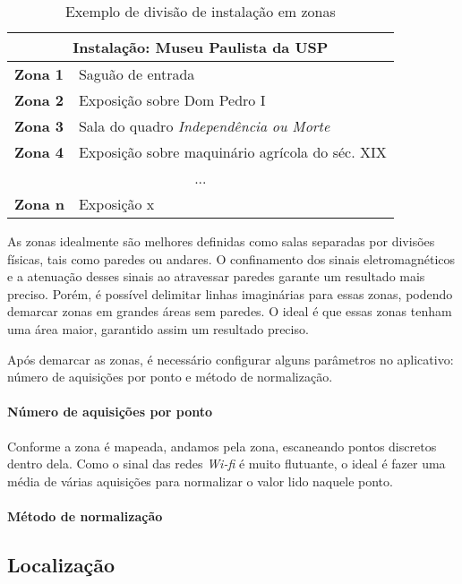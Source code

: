 \begin{table}[htb]
\centering
\caption{Exemplo de divisão de instalação em zonas}
\label{my-label}
\begin{tabular}{|l|l|l|l|l|}
\hline
\multicolumn{5}{|c|}{\textbf{Instalação: Museu Paulista da USP}}             \\ \hline
\multicolumn{2}{|l|}{\textbf{Zona 1}} & \multicolumn{3}{l|}{Saguão de entrada}          \\ \hline
\multicolumn{2}{|l|}{\textbf{Zona 2}} & \multicolumn{3}{l|}{Exposição sobre Dom Pedro I}          \\ \hline
\multicolumn{2}{|l|}{\textbf{Zona 3}} & \multicolumn{3}{l|}{Sala do quadro \textit{Independência ou Morte}}          \\ \hline
\multicolumn{2}{|l|}{\textbf{Zona 4}} & \multicolumn{3}{l|}{Exposição sobre maquinário agrícola do séc. XIX}          \\ \hline
\multicolumn{5}{|c|}{...}                                                    \\ \hline
\multicolumn{2}{|l|}{\textbf{Zona n}} & \multicolumn{3}{l|}{Exposição x}     \\ \hline
\end{tabular}
\end{table}

As zonas idealmente são melhores definidas como salas separadas por divisões físicas, tais como paredes ou andares. O confinamento dos sinais eletromagnéticos e a atenuação desses sinais ao atravessar paredes garante um resultado mais preciso. Porém, é possível delimitar linhas imaginárias para essas zonas, podendo demarcar zonas em grandes áreas sem paredes. O ideal é que essas zonas tenham uma área maior, garantido assim um resultado preciso.
\par
Após demarcar as zonas, é necessário configurar alguns parâmetros no aplicativo: número de aquisições por ponto e método de normalização.

\paragraph*{Número de aquisições por ponto\\}
Conforme a zona é mapeada, andamos pela zona, escaneando pontos discretos dentro dela. Como o sinal das redes \textit{Wi-fi} é muito flutuante, o ideal é fazer uma média de várias aquisições para normalizar o valor lido naquele ponto.
\paragraph*{Método de normalização\\}


\subsection{Localização}